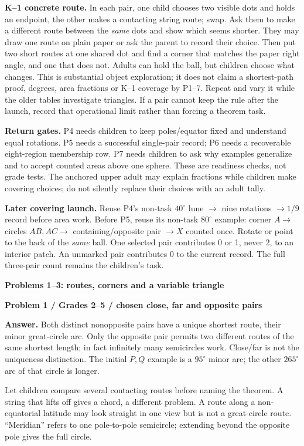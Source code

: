\documentclass[11pt,letterpaper]{article}
\newcommand{\topic}[1]{\par{\large\bfseries\color{blue}#1}\par}
\newcommand{\sub}[1]{\par\textbf{#1}\par}
\newcommand{\degc}{^\circ}
\begin{document}
\textbf{K--1 concrete route.} In each pair, one child chooses two visible dots and holds an endpoint, the other makes a contacting string route; swap. Ask them to make a different route between the \emph{same} dots and show which seems shorter. They may draw one route on plain paper or ask the parent to record their choice. Then put two short routes at one shared dot and find a corner that matches the paper right angle, and one that does not. Adults can hold the ball, but children choose what changes. This is substantial object exploration; it does not claim a shortest-path proof, degrees, area fractions or K--1 coverage by P1--7. Repeat and vary it while the older tables investigate triangles. If a pair cannot keep the rule after the launch, record that operational limit rather than forcing a theorem task.

\textbf{Return gates.} P4 needs children to keep poles/equator fixed and understand equal rotations. P5 needs a successful single-pair record; P6 needs a recoverable eight-region membership row. P7 needs children to ask why examples generalize and to accept counted areas above one sphere. These are readiness checks, not grade tests. The anchored upper adult may explain fractions while children make covering choices; do not silently replace their choices with an adult tally.

\textbf{Later covering launch.} Reuse P4's non-task $40\degc$ lune $\to$ nine rotations $\to1/9$ record before area work. Before P5, reuse its non-task $80\degc$ example: corner $A\to$ circles $AB,AC\to$ containing/opposite pair $\to X$ counted once. Rotate or point to the back of the \emph{same} ball. One selected pair contributes 0 or 1, never 2, to an interior patch. An unmarked pair contributes 0 to the current record. The full three-pair count remains the children's task.

\newpage
\topic{Problems 1--3: routes, corners and a variable triangle}
\sub{Problem 1 / Grades 2--5 / chosen close, far and opposite pairs}
\textbf{Answer.} Both distinct nonopposite pairs have a unique shortest route, their minor great-circle arc. Only the opposite pair permits two different routes of the same shortest length; in fact infinitely many semicircles work. Close/far is not the uniqueness distinction. The initial $P,Q$ example is a $95\degc$ minor arc; the other $265\degc$ arc of that circle is longer.

Let children compare several contacting routes before naming the theorem. A string that lifts off gives a chord, a different problem. A route along a non-equatorial latitude may look straight in one view but is not a great-circle route. ``Meridian'' refers to one pole-to-pole semicircle; extending beyond the opposite pole gives the full circle.
\end{document}
